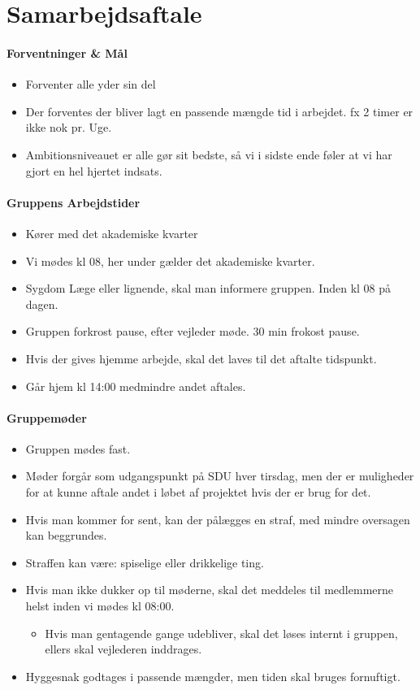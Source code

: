 \section{Samarbejdsaftale} \label{samarbejdsaftale}
\paragraph{Forventninger \& Mål}
\begin{itemize}
    \item Forventer alle yder sin del
    \item Der forventes der bliver lagt en passende mængde tid i arbejdet. fx 2 timer er ikke nok pr. Uge.
    \item Ambitionsniveauet er alle gør sit bedste, så vi i sidste ende føler at vi har gjort en hel hjertet indsats.
\end{itemize}

\paragraph{Gruppens Arbejdstider}
\begin{itemize}
    \item Kører med det akademiske kvarter
    \item Vi mødes kl 08, her under gælder det akademiske kvarter.
    \item Sygdom Læge eller lignende, skal man informere gruppen. Inden kl 08 på dagen.
    \item Gruppen forkrost pause, efter vejleder møde. 30 min frokost pause.
    \item Hvis der gives hjemme arbejde, skal det laves til det aftalte tidspunkt.
    \item Går hjem kl 14:00 medmindre andet aftales.
\end{itemize}

\paragraph{Gruppemøder}
\begin{itemize}
    \item Gruppen mødes fast.
    \item Møder forgår som udgangspunkt på SDU hver tirsdag, men der er muligheder for at kunne aftale andet i løbet af projektet hvis der er brug for det.
    \item Hvis man kommer for sent, kan der pålægges en straf, med mindre oversagen kan beggrundes.
    \item Straffen kan være: spiselige eller drikkelige ting. 
    \item Hvis man ikke dukker op til møderne, skal det meddeles til medlemmerne helst inden vi mødes kl 08:00.
	\begin{itemize}
	    \item Hvis man gentagende gange udebliver, skal det løses internt i gruppen, ellers skal vejlederen inddrages.
	\end{itemize}
    \item Hyggesnak godtages i passende mængder, men tiden skal bruges fornuftigt.
\end{itemize}


